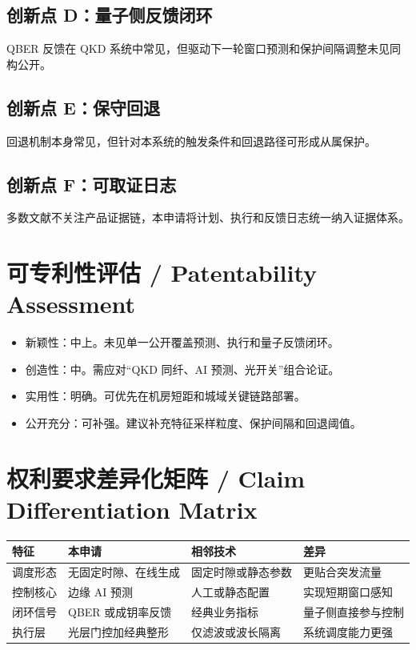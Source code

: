 ﻿\documentclass[12pt,a4paper]{article}
\begin{document}
\subsection{创新点 D：量子侧反馈闭环}
QBER 反馈在 QKD 系统中常见，但驱动下一轮窗口预测和保护间隔调整未见同构公开。

\subsection{创新点 E：保守回退}
回退机制本身常见，但针对本系统的触发条件和回退路径可形成从属保护。

\subsection{创新点 F：可取证日志}
多数文献不关注产品证据链，本申请将计划、执行和反馈日志统一纳入证据体系。

\section{可专利性评估 / Patentability Assessment}
\begin{itemize}
\item 新颖性：中上。未见单一公开覆盖预测、执行和量子反馈闭环。
\item 创造性：中。需应对“QKD 同纤、AI 预测、光开关”组合论证。
\item 实用性：明确。可优先在机房短距和城域关键链路部署。
\item 公开充分：可补强。建议补充特征采样粒度、保护间隔和回退阈值。
\end{itemize}

\section{权利要求差异化矩阵 / Claim Differentiation Matrix}
\begin{tabular}{|p{2.8cm}|p{3.8cm}|p{3.8cm}|p{2.8cm}|}
\hline
特征 & 本申请 & 相邻技术 & 差异 \\
\hline
调度形态 & 无固定时隙、在线生成 & 固定时隙或静态参数 & 更贴合突发流量 \\
\hline
控制核心 & 边缘 AI 预测 & 人工或静态配置 & 实现短期窗口感知 \\
\hline
闭环信号 & QBER 或成钥率反馈 & 经典业务指标 & 量子侧直接参与控制 \\
\hline
执行层 & 光层门控加经典整形 & 仅滤波或波长隔离 & 系统调度能力更强 \\
\hline
\end{tabular}
\end{document}
